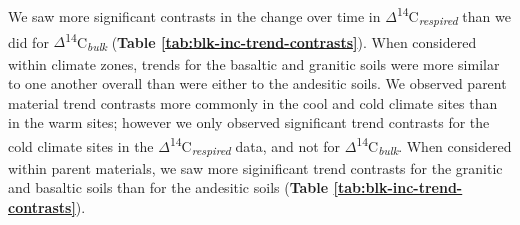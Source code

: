 \documentclass[english,man,floatsintext]{apa6}
\begin{document}
We saw more significant contrasts in the change over time in \(\Delta\)\textsuperscript{14}C\textsubscript{\emph{respired}} than we did for \(\Delta\)\textsuperscript{14}C\textsubscript{\emph{bulk}} (\textbf{Table \ref{tab:blk-inc-trend-contrasts}}). When considered within climate zones, trends for the basaltic and granitic soils were more similar to one another overall than were either to the andesitic soils. We observed parent material trend contrasts more commonly in the cool and cold climate sites than in the warm sites; however we only observed significant trend contrasts for the cold climate sites in the \(\Delta\)\textsuperscript{14}C\textsubscript{\emph{respired}} data, and not for \(\Delta\)\textsuperscript{14}C\textsubscript{\emph{bulk}}. When considered within parent materials, we saw more siginificant trend contrasts for the granitic and basaltic soils than for the andesitic soils (\textbf{Table \ref{tab:blk-inc-trend-contrasts}}).



\begingroup\fontsize{10}{12}\selectfont
\end{document}
